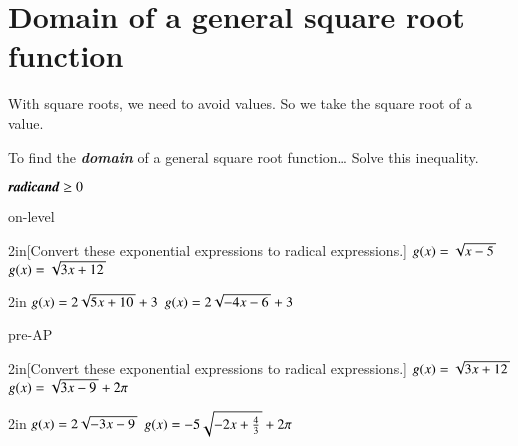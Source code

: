 \newpage
\section{Domain of a general square root function}

With square roots, we need to avoid  values. 
So we  take the square root of a  value.

\begin{myConcept}{To find the {\bfseries\itshape domain} of a general square root function\dots}
    Solve this inequality.
    \begin{myCenteredBox}[width=2in]
        \centering\LARGE 
        $ \text{\itshape\bfseries radicand} \geq 0 $ 
    \end{myCenteredBox}
\end{myConcept}




\begin{taggedblock}{on-level}
    \begin{my2Problems}{2in}[Convert these exponential expressions to radical expressions.]
        {
            $ g(x) = \myRoot{x - 5}$ 
        }
        {
            $ g(x) = \myRoot{3x + 12}$ 
        }
    \end{my2Problems}
    \begin{my2Problems}{2in}
        {
            $ g(x) = 2\myRoot{5x + 10} + 3$ 
        }
        {
            $ g(x) = 2\myRoot{-4x - 6} + 3$ 
        }
    \end{my2Problems}
\end{taggedblock}


\begin{taggedblock}{pre-AP}
    \begin{my2Problems}{2in}[Convert these exponential expressions to radical expressions.]
        {
            $ g(x) = \myRoot{3x + 12}$ 
        }
        {
            $ g(x) = \myRoot{3x - 9} + 2\pi$ 
        }
    \end{my2Problems}
    \begin{my2Problems}{2in}
        {
            $ g(x) = 2\myRoot{-3x - 9}$ 
        }
        {
            $ g(x) = -5\myRoot{-2x + \frac{4}{3}} + 2\pi$ 
        }
    \end{my2Problems}
\end{taggedblock}